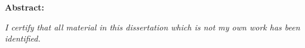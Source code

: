 \documentclass[a4paper,oneside,11pt]{article}
\begin{document}
{{{
\title{}
\author{}
\date{}

\maketitle

\textbf{Abstract:}
\vspace*{\fill}

\begin{center}
	\textit{I certify that all material in this dissertation which is not my own work has been
	identified.}
\end{center}

\thispagestyle{empty}
\setcounter{page}{0}

\newpage
}}}

\newpage

\printbibliography
\end{document}
